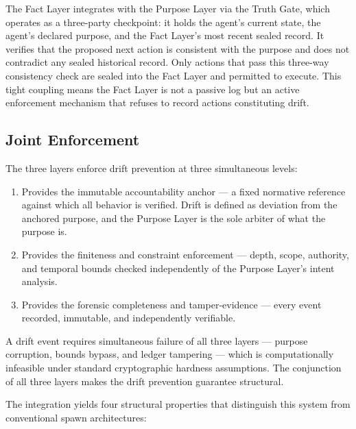 The Fact Layer integrates with the Purpose Layer via the Truth Gate, which operates as a three-party checkpoint: it holds the agent's current state, the agent's declared purpose, and the Fact Layer's most recent sealed record. It verifies that the proposed next action is consistent with the purpose and does not contradict any sealed historical record. Only actions that pass this three-way consistency check are sealed into the Fact Layer and permitted to execute. This tight coupling means the Fact Layer is not a passive log but an active enforcement mechanism that refuses to record actions constituting drift.

\subsection{Joint Enforcement}

The three layers enforce drift prevention at three simultaneous levels:

\begin{enumerate}
  \item[\textbf{Logical layer (Purpose Layer):}] Provides the immutable accountability anchor — a fixed normative reference against which all behavior is verified. Drift is defined as deviation from the anchored purpose, and the Purpose Layer is the sole arbiter of what the purpose is.
  \item[\textbf{Structural layer (Bounds Engine):}] Provides the finiteness and constraint enforcement — depth, scope, authority, and temporal bounds checked independently of the Purpose Layer's intent analysis.
  \item[\textbf{Archival layer (Fact Layer):}] Provides the forensic completeness and tamper-evidence — every event recorded, immutable, and independently verifiable.
\end{enumerate}

A drift event requires simultaneous failure of all three layers — purpose corruption, bounds bypass, and ledger tampering — which is computationally infeasible under standard cryptographic hardness assumptions. The conjunction of all three layers makes the drift prevention guarantee structural.

The integration yields four structural properties that distinguish this system from conventional spawn architectures:

